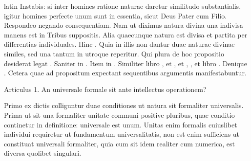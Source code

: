 \begin{otherlanguage*}{latin}
\pstart
 Instabis: si inter homines ratione naturae daretur similitudo substantialis, igitur homines perfecte unum sunt in essentia, sicut Deus Pater cum Filio. Respondeo negando consequentiam. Nam ut diximus natura divina una indivisa manens est in Tribus suppositis. Alia quaecunque natura est divisa et partita per differentias individuales. Hinc . Quia in illis non dantur duae naturae divinae similes, sed una tantum in utroque reperitur. Qui plura de hoc propositio desiderat legat . Saniter in . Item in . Similiter libro , et , et , , et libro . Denique . Cetera quae ad propositum expectant sequentibus argumentis manifestabuntur. 
\pend

        \pstart
        \pend
      
        \pstart
        \pend
      
\pstart
\noindent%
 Articulus 1. An universale formale sit ante intellectus operationem? 
\pend

\pstart
  Primo ex dictis colliguntur duae conditiones ut natura sit formaliter universalis. Prima ut sit una formaliter unitate communi positive pluribus, quae conditio continetur in definitione: universale est unum. Unitas enim formalis cuiuslibet individui requiretur ut fundamentum universalitatis, non est enim sufficiens ut constituat universali formaliter, quia cum sit idem realiter cum numerica, est diversa quolibet singulari. 
\pend


\end{otherlanguage*}
